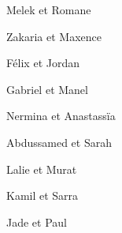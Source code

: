\item Melek et Romane
\item Zakaria et Maxence
\item Félix et Jordan
\item Gabriel et Manel
\item Nermina et Anastassïa
\item Abdussamed et Sarah
\item Lalie et Murat
\item Kamil et Sarra
\item Jade et Paul
